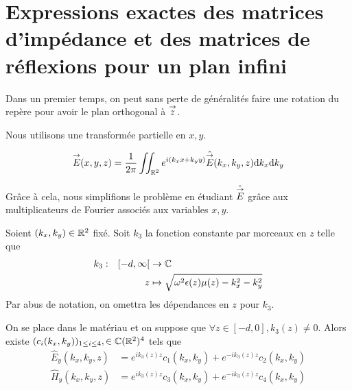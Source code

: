 \section{Expressions exactes des matrices d'impédance et des matrices de réflexions pour un plan infini}

    Dans un premier temps, on peut sans perte de généralités faire une rotation du repère pour avoir le plan orthogonal à \(\vect{z}\).

    \begin{figure}[!h]
        \begin{center}
            \begin{tikzpicture}
                
            \end{tikzpicture}
        \end{center}
    \end{figure}

    Nous utilisons une transformée partielle en \(x, y\).

    \begin{equation}
        \vE(x,y,z) = \frac{1}{2\pi}\iint_{\RR^2} e^{i(k_x x + k_y y)}\hat{\vE} (k_x,k_y,z) \dd{k_x}\dd{k_y}
    \end{equation}

    Grâce à cela, nous simplifions le problème en étudiant \( \hat{\vE}\) grâce aux multiplicateurs de Fourier associés aux variables \(x,y\). 

    \begin{defn}
        Soient \((k_x,k_y) \in \RR^2\) fixé.
        Soit \(k_3\) la fonction constante par morceaux en \(z\) telle que
        \begin{equation*}
          \fonction{k_3}{[-d,\infty[}{\CC}
          {z}{\sqrt{\w^2\eps(z)\mu(z) - k_x^2 - k_y^2}}
        \end{equation*}
        Par abus de notation, on omettra les dépendances en \(z\) pour \(k_3\).
    \end{defn}

    \begin{prop}
        On se place dans le matériau et on suppose que \(\forall z \in [-d,0], k_3(z) \not = 0\).
        Alors existe \((c_i(k_x,k_y))_{1\le i \le4}, \in \CC(\RR^2)^4\) tels que
        \begin{subequations}
            \begin{align}
                \hat{E}_y(k_x,k_y,z) & = e^{ik_3(z)z}c_1(k_x,k_y) + e^{-ik_3(z)z}c_2(k_x,k_y)
                \\
                \hat{H}_y(k_x,k_y,z) & = e^{ik_3(z)z}c_3(k_x,k_y) + e^{-ik_3(z)z}c_4(k_x,k_y)
            \end{align}
        \end{subequations}
    \end{prop}

